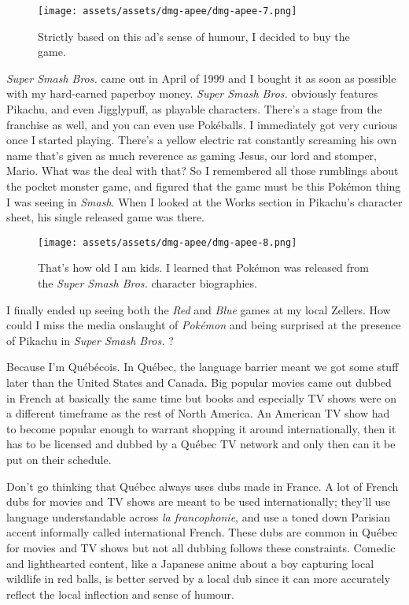 \documentclass{book}
\begin{document}
\begin{figure}[hbt]
\vskip 10pt
\centering \texttt{[image: assets/assets/dmg-apee/dmg-apee-7.png]}\par\pagetwodescription Strictly based on this ad’s sense of humour, I decided to buy the game.
\vskip 6pt
\end{figure}

\emph{Super Smash Bros.} came out in April of 1999 and I bought it as soon as possible with my hard-earned paperboy money. \emph{Super Smash Bros.} obviously features Pikachu, and even Jigglypuff, as playable characters. There’s a stage from the franchise as well, and you can even use Pokéballs. I immediately got very curious once I started playing. There’s a yellow electric rat constantly screaming his own name that’s given as much reverence as gaming Jesus, our lord and stomper, Mario. What was the deal with that? So I remembered all those rumblings about the pocket monster game, and figured that the game must be this Pokémon thing I was seeing in \emph{Smash}. When I looked at the Works section in Pikachu’s character sheet, his single released game was there.

\begin{figure}[hbt]
\vskip 10pt
\centering \texttt{[image: assets/assets/dmg-apee/dmg-apee-8.png]}\par\pagetwodescription That’s how old I am kids. I learned that Pokémon was released from the \emph{Super Smash Bros.} character biographies.
\vskip 6pt
\end{figure}

I finally ended up seeing both the \emph{Red} and \emph{Blue} games at my local Zellers. How could I miss the media onslaught of \emph{Pokémon} and being surprised at the presence of Pikachu in \emph{Super Smash Bros.} ?

Because I’m Québécois. In Québec, the language barrier meant we got some stuff later than the United States and Canada. Big popular movies came out dubbed in French at basically the same time but books and especially TV shows were on a different timeframe as the rest of North America. An American TV show had to become popular enough to warrant shopping it around internationally, then it has to be licensed and dubbed by a Québec TV network and only then can it be put on their schedule.

Don’t go thinking that Québec always uses dubs made in France. A lot of French dubs for movies and TV shows are meant to be used internationally; they’ll use language understandable across \emph{la francophonie}, and use a toned down Parisian accent informally called international French. These dubs are common in Québec for movies and TV shows but not all dubbing follows these constraints. Comedic and lighthearted content, like a Japanese anime about a boy capturing local wildlife in red balls, is better served by a local dub since it can more accurately reflect the local inflection and sense of humour.
\end{document}
